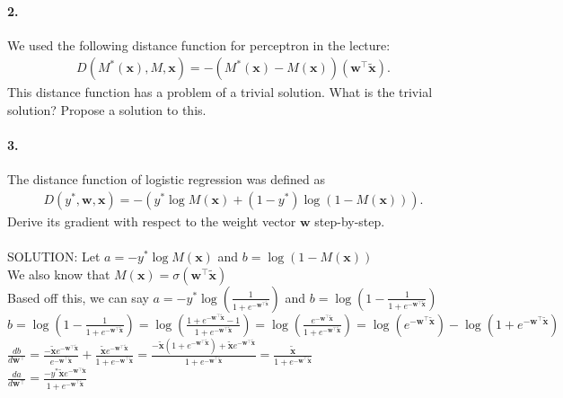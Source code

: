 \documentclass{article}
\newcommand{\vect}[1]{\mathbf{#1}}
\newcommand{\vx}[0]{\vect{x}}
\newcommand{\vw}[0]{\vect{w}}
\newcommand{\sigmoid}{\sigma}
\begin{document}
\vspace{5mm}

\paragraph{2.} We used the following distance function for perceptron in the
lecture:
\begin{align*}
    D(M^*(\vx), M, \vx) = -\left( M^*(\vx) - M(\vx)
    \right) \left(\vw^\top
    \tilde{\vx}\right).
\end{align*}
This distance function has a problem of a trivial solution. What is the trivial
solution? Propose a solution to this.

\vspace{5mm}

\paragraph{3.} The distance function of logistic regression was defined as 
\begin{align*}
    D(y^*, \vw, \vx) = -(y^* \log M(\vx) + (1-y^*) \log (1- M(\vx))).
\end{align*}
Derive its gradient with respect to the weight vector $\vw$ step-by-step.
\\
\\
SOLUTION: 
Let $a = -y^* \log M(\vx)$ and $b =  \log (1- M(\vx))$ \\
We also know that $M(\vx) = \sigmoid(\vw^\top \tilde{\vx}) $ \\
Based off this, we can say $a = -y^* \log ( \frac{1}{1+e^{-\vw^{\top \tilde{\vx}}}})$ and $b =  \log (1- \frac{1}{1+e^{-\vw^\top \tilde{\vx}}})$ \\
$b = \log (1- \frac{1}{1+e^{-\vw^\top \tilde{\vx}}}) = \log ( \frac{1+e^{-\vw^\top \tilde{\vx} } - 1}{1+e^{-\vw^\top \tilde{\vx}}}) = \log ( \frac{e^{-\vw^\top \tilde{\vx} }}{1+e^{-\vw^\top \tilde{\vx}}}) =  \log ( e^{-\vw^\top \tilde{\vx} } ) - \log (1+e^{-\vw^\top \tilde{\vx}}) $ \\
$ \frac{db}{d \vw^\top} = \frac{-\tilde{\vx} e^{-\vw^\top \tilde{\vx}}}{e^{-\vw^\top \tilde{\vx}}} + \frac{\tilde{\vx} e^{-\vw^\top \tilde{\vx}}}{1 + e^{-\vw^\top \tilde{\vx}}}  = \frac{-\tilde{\vx} (1 + e^{-\vw^\top \tilde{\vx}}) +\tilde{\vx} e^{-\vw^\top \tilde{\vx}}}{1 + e^{-\vw^\top \tilde{\vx}}}  = \frac{\tilde{\vx}}{1 + e^{-\vw^\top \tilde{\vx}}}$ \\
$ \frac{da}{d \vw^\top} = \frac {-y^* \tilde{\vx}e^{-\vw^\top \tilde{\vx}}}{1 + e^{-\vw^\top \tilde{\vx}}}$ \\
\end{document}
